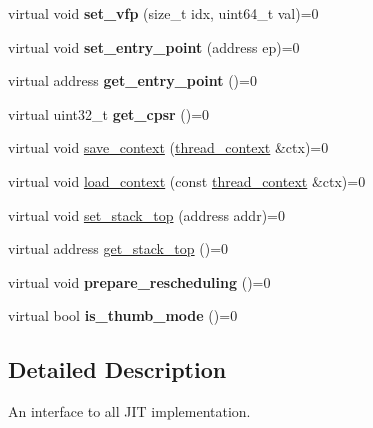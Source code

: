 \begin{DoxyCompactItemize}
virtual void {\bfseries set\+\_\+vfp} (size\+\_\+t idx, uint64\+\_\+t val)=0
\item 
\mbox{\label{classeka2l1_1_1arm_1_1jit__interface_a00c1ee6d3f4f6bea3eb1c0b356fbb9ea}} 
virtual void {\bfseries set\+\_\+entry\+\_\+point} (address ep)=0
\item 
\mbox{\label{classeka2l1_1_1arm_1_1jit__interface_acc32698c51c0e32e406962fe2afcf908}} 
virtual address {\bfseries get\+\_\+entry\+\_\+point} ()=0
\item 
\mbox{\label{classeka2l1_1_1arm_1_1jit__interface_a1ea6a649bd5efd03c4e7824e8c2c44df}} 
virtual uint32\+\_\+t {\bfseries get\+\_\+cpsr} ()=0
\item 
virtual void \mbox{\hyperlink{classeka2l1_1_1arm_1_1jit__interface_ad45558cfaff99f21a89734676b13cb9a}{save\+\_\+context}} (\mbox{\hyperlink{structeka2l1_1_1arm_1_1jit__interface_1_1thread__context}{thread\+\_\+context}} \&ctx)=0
\item 
virtual void \mbox{\hyperlink{classeka2l1_1_1arm_1_1jit__interface_acdb436ffc407767efaec732b619caf04}{load\+\_\+context}} (const \mbox{\hyperlink{structeka2l1_1_1arm_1_1jit__interface_1_1thread__context}{thread\+\_\+context}} \&ctx)=0
\item 
virtual void \mbox{\hyperlink{classeka2l1_1_1arm_1_1jit__interface_af0c5e6bd4d2df8069fbef45c92b72154}{set\+\_\+stack\+\_\+top}} (address addr)=0
\item 
virtual address \mbox{\hyperlink{classeka2l1_1_1arm_1_1jit__interface_a9b4bf4ff0fbee63c224a8a94b83508da}{get\+\_\+stack\+\_\+top}} ()=0
\item 
\mbox{\label{classeka2l1_1_1arm_1_1jit__interface_a6b8b6825cb9ddc3350248d1a58015a00}} 
virtual void {\bfseries prepare\+\_\+rescheduling} ()=0
\item 
\mbox{\label{classeka2l1_1_1arm_1_1jit__interface_a090468c6ac0aa22cfb5595cc9c7ed9cf}} 
virtual bool {\bfseries is\+\_\+thumb\+\_\+mode} ()=0
\end{DoxyCompactItemize}


\subsection{Detailed Description}
An interface to all J\+IT implementation. 

